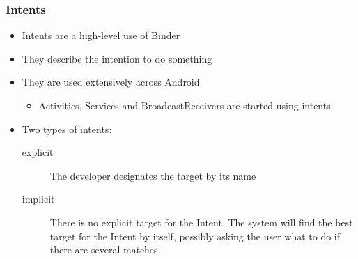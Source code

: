 \begin{frame}
  \frametitle{Intents}
  \begin{itemize}
  \item Intents are a high-level use of Binder
  \item They describe the intention to do something
  \item They are used extensively across Android
    \begin{itemize}
    \item Activities, Services and BroadcastReceivers are started
      using intents
    \end{itemize}
  \item Two types of intents:
    \begin{description}
    \item[explicit] The developer designates the target by its name 
    \item[implicit] There is no explicit target for the Intent. The
      system will find the best target for the Intent by itself, possibly
      asking the user what to do if there are several matches
    \end{description}
  \end{itemize}
\end{frame}
